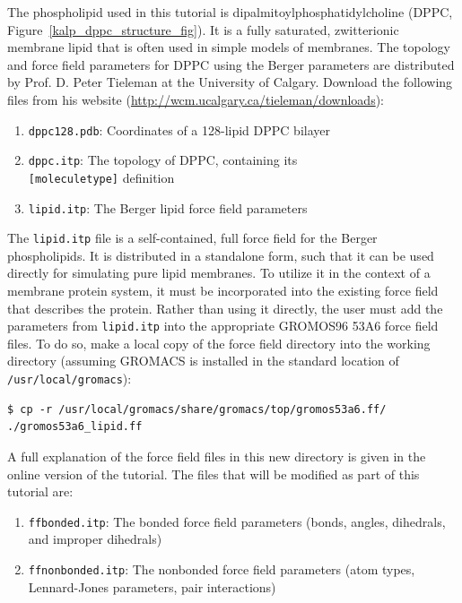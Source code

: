 \documentclass[9pt,tutorial,pubversion]{livecoms}
\begin{document}
The phospholipid used in this tutorial is dipalmitoylphosphatidylcholine (DPPC, Figure~\ref{kalp_dppc_structure_fig}). It is a fully saturated, zwitterionic membrane lipid that is often used in simple models of membranes. The topology and force field parameters for DPPC using the Berger parameters are distributed by Prof. D. Peter Tieleman at the University of Calgary. Download the following files from his website (\url{http://wcm.ucalgary.ca/tieleman/downloads}):

\begin{enumerate}
	\item{\texttt{dppc128.pdb}: Coordinates of a 128-lipid DPPC bilayer}
	\item{\texttt{dppc.itp}: The topology of DPPC, containing its\\ \texttt{[moleculetype]} definition}
	\item{\texttt{lipid.itp}: The Berger lipid force field parameters}
\end{enumerate}

The \texttt{lipid.itp} file is a self-contained, full force field for the Berger phospholipids. It is distributed in a standalone form, such that it can be used directly for simulating pure lipid membranes. To utilize it in the context of a membrane protein system, it must be incorporated into the existing force field that describes the protein. Rather than using it directly, the user must add the parameters from \texttt{lipid.itp} into the appropriate GROMOS96 53A6 force field files. To do so, make a local copy of the force field directory into the working directory (assuming GROMACS is installed in the standard location of \texttt{/usr/local/gromacs}):

\begin{lstlisting}[basicstyle=\footnotesize\ttfamily]
$ cp -r /usr/local/gromacs/share/gromacs/top/gromos53a6.ff/ ./gromos53a6_lipid.ff
\end{lstlisting}
%
A full explanation of the force field files in this new directory is given in the online version of the tutorial. The files that will be modified as part of this tutorial are:

\begin{enumerate}
	\item{\texttt{ffbonded.itp}: The bonded force field parameters (bonds, angles, dihedrals, and improper dihedrals)}
	\item{\texttt{ffnonbonded.itp}: The nonbonded force field parameters (atom types, Lennard-Jones parameters, pair interactions)}
\end{enumerate}
\end{document}

